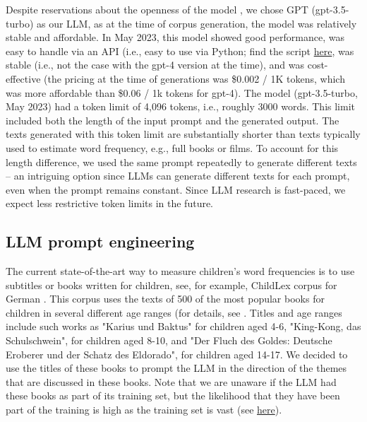 \documentclass[jou, a4paper]{apa7}
\begin{document}
Despite reservations about the openness of the model \citep[see, e.g., ][]{liesenfeld_opening_2023}, we chose GPT (gpt-3.5-turbo) as our LLM, as at the time of corpus generation, the model was relatively stable and affordable. In May 2023, this model showed good performance, was easy to handle via an API (i.e., easy to use via Python; find the script \href{https://github.com/bgagl/generate_text_GPTChat}{here}, was stable (i.e., not the case with the gpt-4 version at the time), and was cost-effective (the pricing at the time of generations was \$0.002 / 1K tokens, which was more affordable than \$0.06 / 1k tokens for gpt-4). The model (gpt-3.5-turbo, May 2023) had a token limit of 4,096 tokens, i.e., roughly 3000 words. This limit included both the length of the input prompt and the generated output. The texts generated with this token limit are substantially shorter than texts typically used to estimate word frequency, e.g., full books or films. To account for this length difference, we used the same prompt repeatedly to generate different texts – an intriguing option since LLMs can generate different texts for each prompt, even when the prompt remains constant. Since LLM research is fast-paced, we expect less restrictive token limits in the future.  


\subsection*{LLM prompt engineering}

The current state-of-the-art way to measure children's word frequencies is to use subtitles or books written for children, see, for example, ChildLex corpus for German \citep{schroeder_childlex_2015}. This corpus uses the texts of 500 of the most popular books for children in several different age ranges (for details, see \citep{schroeder_childlex_2015}. Titles and age ranges include such works as "Karius und Baktus" for children aged 4-6, "King-Kong, das Schulschwein", for children aged 8-10, and "Der Fluch des Goldes: Deutsche Eroberer und der Schatz des Eldorado", for children aged 14-17. We decided to use the titles of these books to prompt the LLM in the direction of the themes that are discussed in these books. Note that we are unaware if the LLM had these books as part of its training set, but the likelihood that they have been part of the training is high as the training set is vast (see \href{https://www.washingtonpost.com/technology/interactive/2023/ai-chatbot-learning/}{here}).  
 
\end{document}
